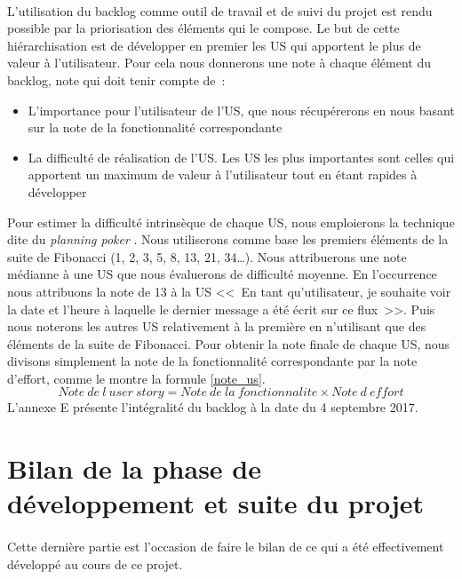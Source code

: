 			\paragraph{}%
			L'utilisation du backlog comme outil de travail et de suivi du projet est
			rendu possible par la priorisation des éléments qui le compose. Le but de
			cette hiérarchisation est de développer en premier les US qui
			apportent le plus de valeur à l'utilisateur. Pour cela nous donnerons
			une note à chaque élément du backlog, note qui doit tenir compte de~:
			\begin{itemize}
			  \item L'importance pour l'utilisateur de l'US, que nous
			  récupérerons en nous basant sur la note de la fonctionnalité correspondante
			  \item La difficulté de réalisation de l'US. Les US les
			  plus importantes sont celles qui apportent un maximum de valeur à
			  l'utilisateur tout en étant rapides à développer
			\end{itemize}
			Pour estimer la difficulté intrinsèque de chaque US,
			nous emploierons la technique dite du \textit{planning poker}
			\citep{aubry_scrum_2015}. Nous utiliserons comme base les premiers éléments
			de la suite de Fibonacci (1, 2, 3, 5, 8, 13, 21, 34\ldots). Nous
			attribuerons une note médianne à une US que nous évaluerons de
			difficulté moyenne. En l'occurrence nous attribuons la note de 13 à la US
			<<~En tant qu'utilisateur, je souhaite voir la date et l'heure à laquelle le
			dernier message a été écrit sur ce flux~>>.
			Puis nous noterons les autres US relativement à la première en
			n'utilisant que des éléments de la suite de Fibonacci.\newline
			Pour obtenir la note finale de chaque US, nous divisons simplement la
			note de la fonctionnalité correspondante par la note d'effort, comme le
			montre la formule \ref{note_us}.
			\begin{equation}
				\label{note_us}
				Note\ de\ l\ user\ story=Note\ de\ la\ fonctionnalite \times Note\ d\ effort
			\end{equation}
			L'annexe E présente l'intégralité du backlog à la date du 4 septembre 2017.
	
	\section{Bilan de la phase de développement et suite du projet}
		\paragraph{}
		Cette dernière partie est l'occasion de faire le bilan de ce qui a été
		effectivement développé au cours de ce projet.
		
